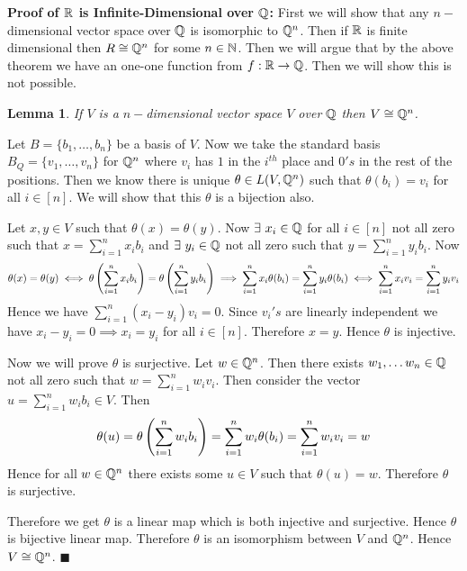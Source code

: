 \documentclass[a4paper, 11pt]{article}
\newtheorem{lemma}{Lemma}
\renewenvironment{proof}{\noindent{\it \textbf{Proof:}}\hspace*{1em}}{\hfill $\blacksquare$\bigskip\\}
\begin{document}
{\begin{itemize}
	\textbf{Proof of $\boldsymbol{\mathbb{R}}$ is Infinite-Dimensional over $\boldsymbol{\mathbb{Q}}$:} First we will show that any $n-$dimensional vector space over $\mathbb{Q}$ is isomorphic to $\mathbb{Q}^n$. Then if $\mathbb{R}$ is finite dimensional then $R\cong \mathbb{Q}^n$ for some $n\in\mathbb{N}$. Then we will argue that by the above theorem we have an one-one function from $f:\mathbb{R}\to \mathbb{Q}$. Then we will show this is not possible.\parinn
	
	\begin{lemma}\label{vtoqiso}
		If $V$ is  a $n-$dimensional vector space $V$ over $\mathbb{Q}$ then $V\cong \mathbb{Q}^n$.
	\end{lemma}
\begin{proof}
	Let $B=\{b_1,\dots,b_n\}$ be a basis of $V$. Now we take the standard basis  $B_Q=\{v_1,\dots,v_n\}$ for $\mathbb{Q}^n$ where $v_i$ has $1$ in the $i^{th}$ place and  $0's$ in the rest of the positions. Then we know there is unique $\theta\in L(V,\mathbb{Q}^n)$ such that $\theta(b_i)=v_i$ for all $i\in[n]$. We will show that this $\theta$ is a bijection also.
	
	 Let $x,y\in V$ such that $\theta(x)=\theta(y)$. Now $\exists\ x_i\in \mathbb{Q}$ for all $i\in[n]$ not all zero such that  $x=\sum\limits_{i=1}^nx_ib_i$ and $\exists \ y_i\in\mathbb{Q}$ not all zero such that $y=\sum\limits_{i=1}^ny_ib_i$. Now $$\theta(x)=\theta(y)\iff \theta\left(\sum\limits_{i=1}^nx_ib_i\right)=\theta\left(\sum\limits_{i=1}^ny_ib_i\right)\implies \sum\limits_{i=1}^nx_i\theta(b_i)=\sum\limits_{i=1}^ny_i\theta(b_i)\iff \sum\limits_{i=1}^nx_iv_i=\sum\limits_{i=1}^ny_iv_i$$Hence we have $\sum\limits_{i=1}^n (x_i-y_i)v_i=0$. Since $v_i's $ are linearly independent we have $x_i-y_i=0\implies x_i=y_i$ for all $i\in[n]$. Therefore $x=y$. Hence $\theta$ is injective.
	 
	 Now we will prove $\theta$ is surjective. Let $w\in \mathbb{Q}^n$. Then there exists $w_1,\dots w_n\in \mathbb{Q}$ not all zero such that $w=\sum\limits_{i=1}^n w_iv_i$. Then consider the vector $u=\sum\limits_{i=1}^nw_ib_i\in V$. Then $$\theta(u)=\theta\left(\sum\limits_{i=1}^nw_ib_i\right)=\sum_{i=1}^n w_i\theta(b_i)=\sum_{i=1}^nw_iv_i=w$$Hence for all $w\in \mathbb{Q}^n$ there exists some $u\in V$ such that $\theta(u)=w$. Therefore $\theta$ is surjective. 
	 
	 Therefore we get $\theta$ is a linear map which is both injective and surjective. Hence $\theta$ is bijective linear map. Therefore $\theta$ is an isomorphism between $V$ and $\mathbb{Q}^n$. Hence $V\cong \mathbb{Q}^n$.
\end{proof}


\end{itemize}}
\end{document}
